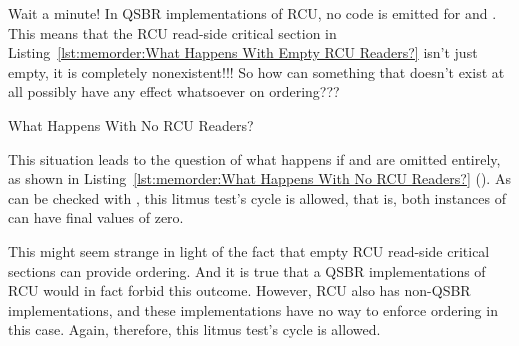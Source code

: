 \QuickQuiz{}
	Wait a minute!
	In QSBR implementations of RCU, no code is emitted for
	 and .
	This means that the RCU read-side critical section in
	Listing~\ref{lst:memorder:What Happens With Empty RCU Readers?}
	isn't just empty, it is completely nonexistent!!!
	So how can something that doesn't exist at all possibly have
	any effect whatsoever on ordering???
 \QuickQuizEnd

\begin{listing}[tb]

\caption{What Happens With No RCU Readers?}
\label{lst:memorder:What Happens With No RCU Readers?}
\end{listing}

This situation leads to the question of what happens if
 and  are omitted
entirely, as shown in
Listing~\ref{lst:memorder:What Happens With No RCU Readers?}
().
As can be checked with , this litmus test's cycle is allowed,
that is, both instances of  can have final values of zero.

This might seem strange in light of the fact that empty RCU
read-side critical sections can provide ordering.
And it is true that a QSBR implementations of RCU would in fact
forbid this outcome.
However, RCU also has non-QSBR implementations, and these implementations
have no way to enforce ordering in this case.
Again, therefore, this litmus test's cycle is allowed.

